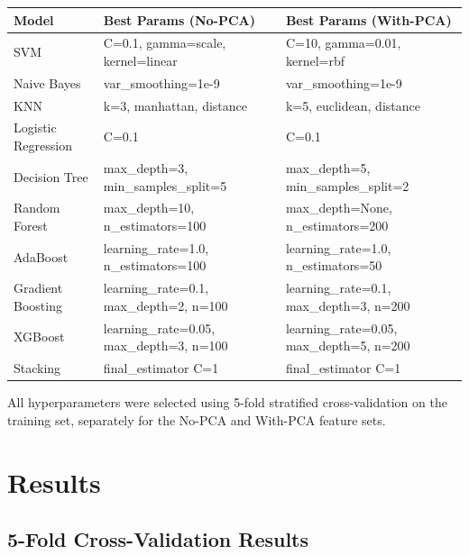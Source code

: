 \documentclass[12pt,a4paper]{article}
\begin{document}
\begin{longtable}{lll}
\toprule
Model & Best Params (No-PCA) & Best Params (With-PCA) \\
\midrule
\endhead
SVM & C=0.1, gamma=scale, kernel=linear & C=10, gamma=0.01, kernel=rbf \\
Naive Bayes & var\_smoothing=1e-9 & var\_smoothing=1e-9 \\
KNN & k=3, manhattan, distance & k=5, euclidean, distance \\
Logistic Regression & C=0.1 & C=0.1 \\
Decision Tree & max\_depth=3, min\_samples\_split=5 & max\_depth=5, min\_samples\_split=2 \\
Random Forest & max\_depth=10, n\_estimators=100 & max\_depth=None, n\_estimators=200 \\
AdaBoost & learning\_rate=1.0, n\_estimators=100 & learning\_rate=1.0, n\_estimators=50 \\
Gradient Boosting & learning\_rate=0.1, max\_depth=2, n=100 & learning\_rate=0.1, max\_depth=3, n=200 \\
XGBoost & learning\_rate=0.05, max\_depth=3, n=100 & learning\_rate=0.05, max\_depth=5, n=200 \\
Stacking & final\_estimator C=1 & final\_estimator C=1 \\
\bottomrule
\end{longtable}

All hyperparameters were selected using 5-fold stratified cross-validation on the training set, separately for the No-PCA and With-PCA feature sets.

\section{Results}

\subsection*{5-Fold Cross-Validation Results}
\end{document}
